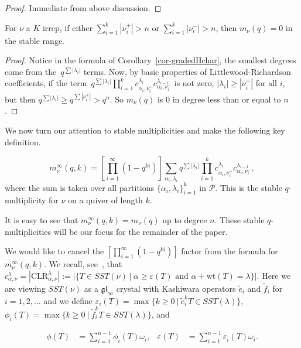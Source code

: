 \documentclass[ALCO,Unicode]{cedram}
\newcommand{\gl}{\mathfrak{gl}}
\newcommand{\Par}{\mathcal{P}}
\newcommand{\wt}{\text{wt}}
\newcommand{\CLR}{\text{CLR}}
\begin{document}
\begin{proof}
    Immediate from above discussion.
\end{proof}

\begin{cor}
    For $\nu$ a $K$ irrep, if either $\sum_{i=1}^k |\nu_i^+| > n$ or $\sum_{i=1}^k |\nu_i^-| > n$, then $m_\nu(q) = 0$ in the stable range.
\end{cor}

\begin{proof}
    Notice in the formula of Corollary~\ref{cor-gradedHchar}, the smallest degrees come from the~$q^{\sum |\lambda_i|}$ terms. Now, by basic properties of Littlewood-Richardson coefficients, if the term~$q^{\sum |\lambda_i|}\prod_{i=1}^k
    c^{\lambda_i}_{\alpha_i, \nu_i^+} c^{\lambda_{i-1}}_{\alpha_i, \nu_i^-}$ is not zero, $|\lambda_i| \geq |\nu_i^+|$ for all $i$, but then $q^{\sum |\lambda_i|} \geq q^{\sum |\nu_i^+|} > q^{n}$. So $m_\nu(q)$ is 0 in degree less than or equal to $n$.
\end{proof}

We now turn our attention to stable multiplicities and make the following key definition.
\begin{defn}
    $$m_\nu^\infty(q,k) = [\prod_{i=1}^\infty(1-q^{ki})]\sum_{\alpha_i, \lambda_i} q^{\sum |\lambda_i|}\prod_{i=1}^k
    c^{\lambda_i}_{\alpha_i, \nu_i^+} c^{\lambda_{i-1}}_{\alpha_i, \nu_i^-},$$
    where the sum is taken over all partitions $\{\alpha_i, \lambda_i\}_{i=1}^k$ in $\Par$. This is the stable $q$-multiplicity for $\nu$ on a quiver of length $k$.
\end{defn}

It is easy to see that $m_\nu^\infty(q,k) = m_\nu(q)$ up to degree $n$. These stable $q$-multiplicities will be our focus for the remainder of the paper.

We would like to cancel the $[\prod_{i=1}^\infty(1-q^{ki})]$ factor from the formula for $m_\nu^\infty(q,k)$. We recall, see~\cite{frohmader2023graded}, that $c^{\lambda}_{\alpha, \nu} = |\CLR^\lambda_{\alpha, \nu}| := |\{T \in SST(\nu) \ | \ \alpha \geq \varepsilon(T) \text{ and } \alpha + \wt(T) = \lambda \}|$. Here we are viewing $SST(\nu)$ as a $\gl_\infty$ crystal with Kashiwara operators $\tilde{e}_i$ and $\tilde{f}_i$ for~$i = 1, 2, \dots $ and we define $\varepsilon_i(T) = \max \{ k \geq 0 \ | \ \tilde{e}_i^k T \in SST(\lambda) \}$, $\phi_i(T) = \max \{ k \geq 0 \ | \ \tilde{f}_i^k T \in SST(\lambda) \}$, and 

\begin{align*}
\phi(T) &= \sum_{i=1}^{n-1}\phi_i(T)\omega_i,   &   \varepsilon(T) &= \sum_{i=1}^{n-1}\varepsilon_i(T)\omega_i.    
\end{align*}
\end{document}

